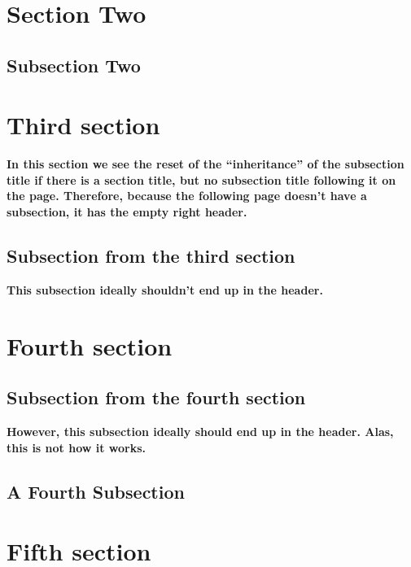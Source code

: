 \documentclass{article}
\begin{document}
 \lipsum[1-2]

\section{Section Two}

 \lipsum[3]

\subsection{Subsection Two}

 \lipsum[4-7]

\section{Third section}
\label{sec:flaw}

{\bfseries In this section we see the reset of the ``inheritance'' of the subsection title if there is a section title, but no subsection title following it on the page. Therefore, because the following page doesn't have a subsection, it has the empty right header.}

\medskip

\lipsum

\subsection{Subsection from the third section}

{\bfseries This subsection ideally shouldn't end up in the header.}

\section{Fourth section}
\label{sec:missing}

\lipsum[1]

\subsection{Subsection from the fourth section}

{\bfseries However, this subsection ideally should end up in the header. Alas, this is not how it works.}

\medskip

\lipsum[1-4]

\subsection{A Fourth Subsection}

\lipsum[7-9]

\vspace{2cm}

\section{Fifth section}
\label{sec:push}

\lipsum[1-6]
\end{document}
